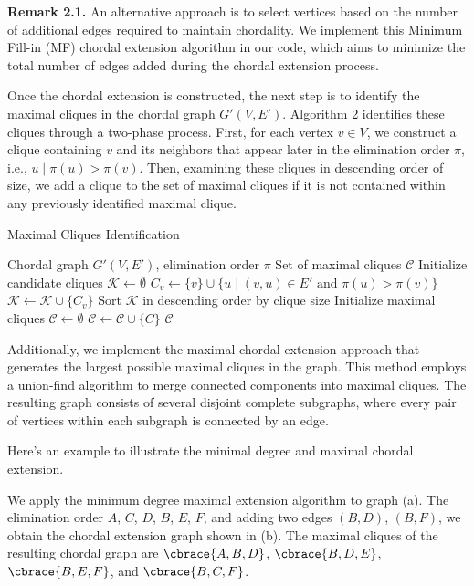 \textbf{Remark 2.1.} An alternative approach is to select vertices based on the number of additional edges required to maintain chordality. We implement this Minimum Fill-in (MF) chordal extension algorithm in our code, which aims to minimize the total number of edges added during the chordal extension process.

Once the chordal extension is constructed, the next step is to identify the maximal cliques in the chordal graph $G'(V, E')$. Algorithm 2 identifies these cliques through a two-phase process. 
First, for each vertex $v \in V$, we construct a clique containing $v$ and its neighbors that appear later in the elimination order $\pi$, i.e., ${u \mid \pi(u) > \pi(v)}$. Then, examining these cliques in descending order of size, we add a clique to the set of maximal cliques if it is not contained within any previously identified maximal clique.

\begin{algorithm}
	\small
	\caption{Maximal Cliques Identification}
	\begin{algorithmic}[1]
	\REQUIRE Chordal graph $G'(V,E')$, elimination order $\pi$
	\ENSURE Set of maximal cliques $\mathcal{C}$
	\STATE Initialize candidate cliques $\mathcal{K} \leftarrow \emptyset$
    	\STATE $C_v \leftarrow \{v\} \cup \{u \mid (v,u) \in E' \text{ and } \pi(u) > \pi(v)\}$
   		\STATE $\mathcal{K} \leftarrow \mathcal{K} \cup \{C_v\}$
	\ENDFOR
	\STATE Sort $\mathcal{K}$ in descending order by clique size
	\STATE Initialize maximal cliques $\mathcal{C} \leftarrow \emptyset$
        	\STATE $\mathcal{C} \leftarrow \mathcal{C} \cup \{C\}$
    	\ENDIF
	\ENDFOR
	\RETURN $\mathcal{C}$
	\end{algorithmic}
\end{algorithm}

Additionally, we implement the maximal chordal extension approach that generates the largest possible maximal cliques in the graph. This method employs a union-find algorithm to merge connected components into maximal cliques. The resulting graph consists of several disjoint complete subgraphs, where every pair of vertices within each subgraph is connected by an edge. 

Here's an example to illustrate the minimal degree and maximal chordal extension.

\begin{example}
	We apply the minimum degree maximal extension algorithm to graph (a). The elimination order $A$, $C$, $D$, $B$, $E$, $F$, and adding two edges $(B,D)$, $(B,F)$, we obtain the chordal extension graph shown in (b). The maximal cliques of the resulting chordal graph are $\cbrace{A,B,D}$, $\cbrace{B,D,E}$, $\cbrace{B,E,F}$, and $\cbrace{B,C,F}$.
	
\end{example}



